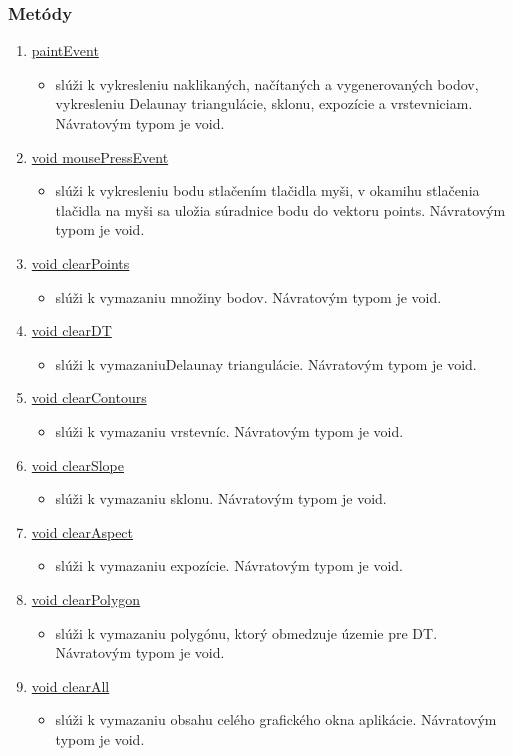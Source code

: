 \documentclass[12pt]{article}
\begin{document}
\subsubsection{Metódy}
\begin{enumerate}
\item[] \underline{paintEvent}
\begin{itemize}
\item slúži k vykresleniu naklikaných, načítaných  a vygenerovaných bodov, vykresleniu Delaunay triangulácie, sklonu, expozície a vrstevniciam. Návratovým typom je void.
\end{itemize}
\item[] \underline{void mousePressEvent}
\begin{itemize}
\item slúži k vykresleniu bodu  stlačením tlačidla myši, v okamihu stlačenia tlačidla na myši sa uložia súradnice bodu do vektoru points. Návratovým typom je void.
\end{itemize}
\item[] \underline{void clearPoints}
\begin{itemize}
\item slúži k vymazaniu množiny bodov. Návratovým typom je void.
\end{itemize}
\item[] \underline{void clearDT}
\begin{itemize}
\item slúži k vymazaniuDelaunay triangulácie. Návratovým typom je void.
\end{itemize}
\item[] \underline{void clearContours}
\begin{itemize}
\item slúži k vymazaniu vrstevníc. Návratovým typom je void.
\end{itemize}
\item[] \underline{void clearSlope}
\begin{itemize}
\item slúži k vymazaniu sklonu. Návratovým typom je void.
\end{itemize}
\item[] \underline{void clearAspect}
\begin{itemize}
\item slúži k vymazaniu expozície. Návratovým typom je void.
\end{itemize}
\item[] \underline{void clearPolygon}
\begin{itemize}
\item slúži k vymazaniu polygónu, ktorý obmedzuje územie pre DT. Návratovým typom je void.
\end{itemize}
\item[] \underline{void clearAll}
\begin{itemize}
\item slúži k vymazaniu obsahu celého grafického okna aplikácie. Návratovým typom je void.
\end{itemize}


\end{enumerate}
\end{document}
